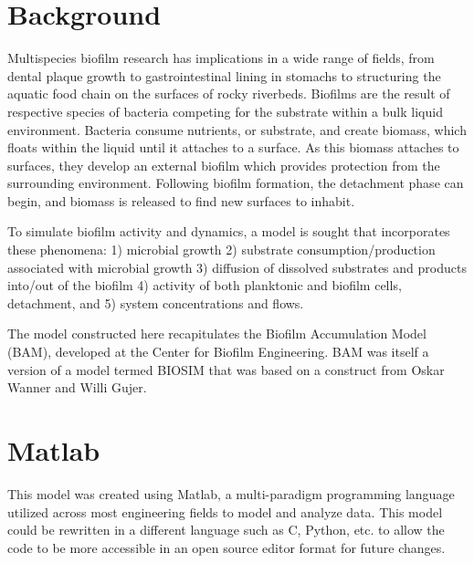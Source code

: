 \documentclass[letterpaper, twoside]{article}
\numberwithin{equation}{section}
\begin{document}
\section{Background}
Multispecies biofilm research has implications in a wide range of fields, from dental plaque growth to gastrointestinal lining in stomachs to structuring the aquatic food chain on the surfaces of rocky riverbeds. Biofilms are the result of respective species of bacteria competing for the substrate within a bulk liquid environment. Bacteria consume nutrients, or substrate, and create biomass, which floats within the liquid until it attaches to a surface. As this biomass attaches to surfaces, they develop an external biofilm which provides protection from the surrounding environment. Following biofilm formation, the detachment phase can begin, and biomass is released to find new surfaces to inhabit.

To simulate biofilm activity and dynamics, a model is sought that incorporates these phenomena: 1) microbial growth 2) substrate consumption/production associated with microbial growth 3) diffusion of dissolved substrates and products into/out of the biofilm 4) activity of both planktonic and biofilm cells, detachment, and 5) system concentrations and flows.

The model constructed here recapitulates the Biofilm Accumulation Model (BAM), developed at the Center for Biofilm Engineering. BAM was itself a version of a model termed BIOSIM that was based on a construct from Oskar Wanner and Willi Gujer.

\section{Matlab}
This model was created using Matlab, a multi-paradigm programming language utilized across most engineering fields to model and analyze data. This model could be rewritten in a different language such as C, Python, etc. to allow the code to be more accessible in an open source editor format for future changes. 
\end{document}
